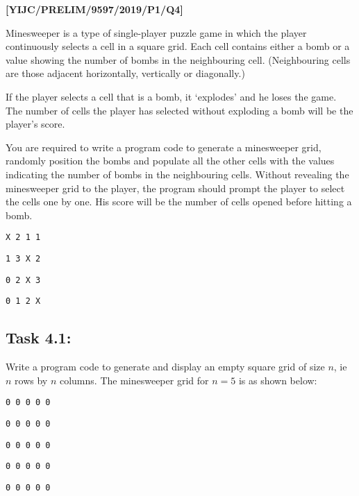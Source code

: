 \item \textbf{{[}YIJC/PRELIM/9597/2019/P1/Q4{]} }

Minesweeper is a type of single-player puzzle game in which the player
continuously selects a cell in a square grid. Each cell contains either
a bomb or a value showing the number of bombs in the neighbouring
cell. (Neighbouring cells are those adjacent horizontally, vertically
or diagonally.)

If the player selects a cell that is a bomb, it \textquoteleft explodes\textquoteright{}
and he loses the game. The number of cells the player has selected
without exploding a bomb will be the player\textquoteright s score.

You are required to write a program code to generate a minesweeper
grid, randomly position the bombs and populate all the other cells
with the values indicating the number of bombs in the neighbouring
cells. Without revealing the minesweeper grid to the player, the program
should prompt the player to select the cells one by one. His score
will be the number of cells opened before hitting a bomb. 
\noindent \begin{center}
\begin{minipage}[t]{0.25\columnwidth}%
\texttt{X 2 1 1 }

\texttt{1 3 X 2 }

\texttt{0 2 X 3 }

\texttt{0 1 2 X }%
\end{minipage}
\par\end{center}

\subsection*{Task 4.1: }

Write a program code to generate and display an empty square grid
of size $n$, ie $n$ rows by $n$ columns. The minesweeper grid for
$n=5$ is as shown below: 
\noindent \begin{center}
\begin{minipage}[t]{0.25\columnwidth}%
\texttt{0 0 0 0 0 }

\texttt{0 0 0 0 0 }

\texttt{0 0 0 0 0 }

\texttt{0 0 0 0 0}

\texttt{0 0 0 0 0 }%
\end{minipage}
\par\end{center}

